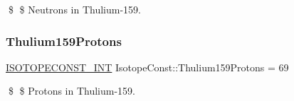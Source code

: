 \$ \$ Neutrons in Thulium-\/159. \mbox{\label{group___isotope_const-_thulium-_tm159_ga4f837aa891fc42bef174fb736b0c6438}} 
\subsubsection{\texorpdfstring{Thulium159\+Protons}{Thulium159Protons}}
{\footnotesize\ttfamily \mbox{\hyperlink{group___isotope_const-_macros_ga5f18360b3e99483a35c32d789e62621c}{I\+S\+O\+T\+O\+P\+E\+C\+O\+N\+S\+T\+\_\+\+I\+NT}} Isotope\+Const\+::\+Thulium159\+Protons = 69}

\$ \$ Protons in Thulium-\/159. 